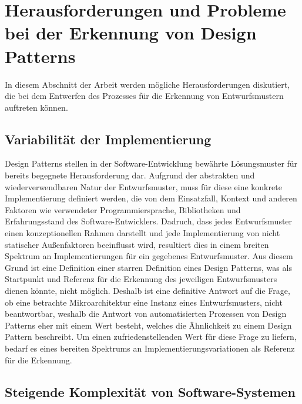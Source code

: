 \section{Herausforderungen und Probleme bei der Erkennung von Design Patterns}

In diesem Abschnitt der Arbeit werden mögliche Herausforderungen diskutiert, die bei dem Entwerfen des Prozesses für die Erkennung von Entwurfsmustern auftreten können. 

\subsection{Variabilität der Implementierung}

Design Patterns stellen in der Software-Entwicklung bewährte Lösungsmuster für bereits begegnete Herausforderung dar. Aufgrund der abstrakten und wiederverwendbaren Natur der Entwurfsmuster,
muss für diese eine konkrete Implementierung definiert werden, die von dem Einsatzfall, Kontext und anderen Faktoren wie verwendeter Programmiersprache, Bibliotheken und Erfahrungsstand des Software-Entwicklers.
Dadruch, dass jedes Entwurfsmuster einen konzeptionellen Rahmen darstellt und jede Implementierung von nicht statischer Außenfaktoren beeinflusst wird, resultiert dies in einem breiten Spektrum an Implementierungen für ein gegebenes Entwurfsmuster.
Aus diesem Grund ist eine Definition einer starren Definition eines Design Patterns, was als Startpunkt und Referenz für die Erkennung des jeweiligen Entwurfsmusters dienen könnte, nicht möglich. 
Deshalb ist eine definitive Antwort auf die Frage, ob eine betrachte Mikroarchitektur eine Instanz eines Entwurfsmusters, nicht beantwortbar, weshalb die Antwort von automatisierten Prozessen von Design Patterns eher mit einem Wert besteht,
welches die Ähnlichkeit zu einem Design Pattern beschreibt. Um einen zufriedenstellenden Wert für diese Frage zu liefern, bedarf es eines bereiten Spektrums an Implementierungsvariationen als Referenz für die Erkennung.

\subsection{Steigende Komplexität von Software-Systemen}

